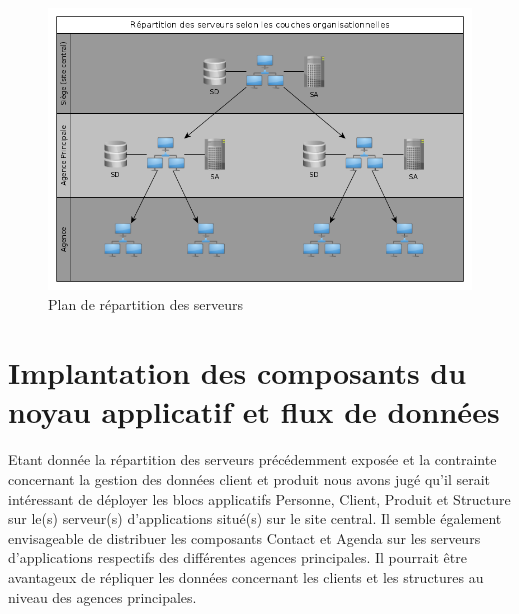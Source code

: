 \begin{figure}[H]
    \centering
    \includegraphics[scale=0.5]{figures/architectureServeurs.png}
    \caption{Plan de répartition des serveurs}
\end{figure}

\section{Implantation des composants du noyau applicatif et flux de données}

Etant donnée la répartition des serveurs précédemment exposée et la contrainte concernant la gestion des données client et produit nous avons jugé qu'il serait intéressant de déployer les blocs applicatifs Personne, Client, Produit et Structure sur le(s) serveur(s) d'applications situé(s) sur le site central. Il semble également envisageable de distribuer les composants Contact et Agenda sur les serveurs d'applications respectifs des différentes agences principales. Il pourrait être avantageux de répliquer les données concernant les clients et les structures au niveau des agences principales. \\

